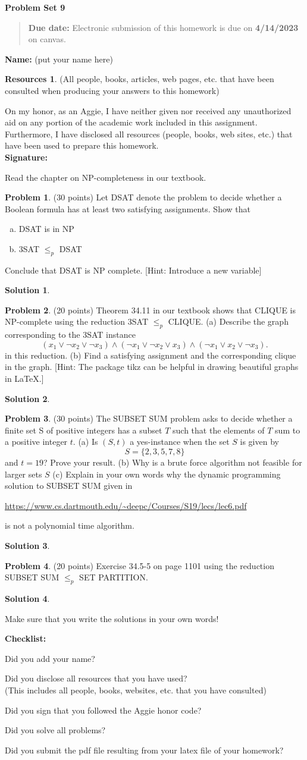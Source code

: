 \documentclass{article}
\theoremstyle{definition}
\newtheorem{problem}{Problem}
\newtheorem*{solution}{Solution}
\newtheorem*{resources}{Resources}
\newcommand{\name}[1]{\noindent\textbf{Name:} {#1}}
\newcommand{\honor}{\noindent On my honor, as an Aggie, I have neither
  given nor received any unauthorized aid on any portion of the
  academic work included in this assignment. Furthermore, I have
  disclosed all resources (people, books, web sites, etc.) that have
  been used to prepare this homework. \\[1ex]
 \textbf{Signature:} \underline{\hspace*{5cm}} }
\newcommand{\checklist}{\noindent\textbf{Checklist:}
\begin{compactitem}[$\Box$] 
\item Did you add your name? 
\item Did you disclose all resources that you have used? \\
(This includes all people, books, websites, etc. that you have consulted)
\item Did you sign that you followed the Aggie honor code? 
\item Did you solve all problems? 
\item Did you submit the pdf file resulting from your latex file 
  of your homework?
\end{compactitem}
}
\newcommand{\problemset}[1]{\begin{center}\textbf{Problem Set #1}\end{center}}
\newcommand{\duedate}[1]{\begin{quote}\textbf{Due date:} Electronic
    submission of this homework is due on \textbf{#1} on canvas.\end{quote}}
\begin{document}
\problemset{9}
\duedate{4/14/2023}
\name{ (put your name here)}
\begin{resources} (All people, books, articles, web pages, etc. that
  have been consulted when producing your answers to this homework)
\end{resources}
\honor

\newpage

Read the chapter on NP-completeness in our textbook.  

\begin{problem} (30 points) 
Let DSAT denote the problem to decide whether a Boolean formula has
at least two satisfying assignments. Show that 
\begin{enumerate}[(a)]
\item DSAT is in NP
\item 3SAT $\le_p$ DSAT
\end{enumerate}
Conclude that DSAT is NP complete. [Hint: Introduce a new variable] 
\end{problem}
\begin{solution}
\end{solution}

\begin{problem} (20 points)
Theorem 34.11 in our textbook shows that CLIQUE is NP-complete using
the reduction 3SAT $\le_p$ CLIQUE. (a) Describe the graph corresponding to
the 3SAT instance 
$$ (x_1 \vee \neg x_2 \vee \neg x_3) \wedge (\neg x_1 \vee \neg x_2
\vee x_3) \wedge (\neg x_1 \vee x_2 \vee \neg x_3).
$$
in this reduction. (b) Find a satisfying assignment and the corresponding
clique in the graph. [Hint: The package tikz can be helpful in drawing
beautiful graphs in LaTeX.] 
\end{problem}
\begin{solution}
\end{solution}

\begin{problem} (30 points) 
The SUBSET SUM problem asks to decide whether a finite set S of
positive integers has a subset $T$ such that the elements of $T$ sum
to a positive integer $t$. (a) Is $(S,t)$ a yes-instance when the set $S$
is given by 
$$ S = \{ 2,3,5,7,8\} $$
and $t= 19$? Prove your result. (b) Why is a brute force algorithm not
feasible for larger sets $S$ (c) Explain in your own words why the 
dynamic programming
solution to SUBSET SUM given in 
\begin{center}
\url{https://www.cs.dartmouth.edu/~deepc/Courses/S19/lecs/lec6.pdf}
\end{center}
is not a polynomial time algorithm. 
\end{problem}
\begin{solution}
\end{solution}


\begin{problem} (20 points) %
Exercise 34.5-5 on page 1101 using the reduction SUBSET SUM $\le_p$ SET PARTITION.
\end{problem}
\begin{solution}
\end{solution}

Make sure that you write the solutions in your own words!
\medskip



\goodbreak
\checklist
\end{document}
